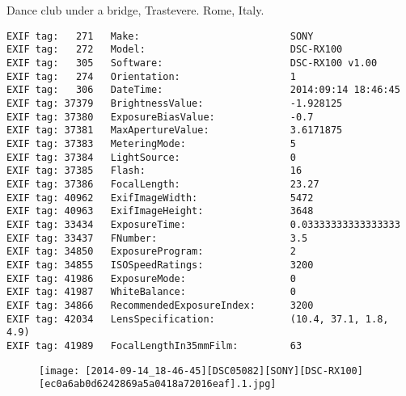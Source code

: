 \section{\protect{}}
\noindent Dance club under a bridge, Trastevere. Rome, Italy.
\noindent
\begin{lstlisting}
EXIF tag:   271   Make:                          SONY
EXIF tag:   272   Model:                         DSC-RX100
EXIF tag:   305   Software:                      DSC-RX100 v1.00
EXIF tag:   274   Orientation:                   1
EXIF tag:   306   DateTime:                      2014:09:14 18:46:45
EXIF tag: 37379   BrightnessValue:               -1.928125
EXIF tag: 37380   ExposureBiasValue:             -0.7
EXIF tag: 37381   MaxApertureValue:              3.6171875
EXIF tag: 37383   MeteringMode:                  5
EXIF tag: 37384   LightSource:                   0
EXIF tag: 37385   Flash:                         16
EXIF tag: 37386   FocalLength:                   23.27
EXIF tag: 40962   ExifImageWidth:                5472
EXIF tag: 40963   ExifImageHeight:               3648
EXIF tag: 33434   ExposureTime:                  0.03333333333333333
EXIF tag: 33437   FNumber:                       3.5
EXIF tag: 34850   ExposureProgram:               2
EXIF tag: 34855   ISOSpeedRatings:               3200
EXIF tag: 41986   ExposureMode:                  0
EXIF tag: 41987   WhiteBalance:                  0
EXIF tag: 34866   RecommendedExposureIndex:      3200
EXIF tag: 42034   LensSpecification:             (10.4, 37.1, 1.8, 4.9)
EXIF tag: 41989   FocalLengthIn35mmFilm:         63

\end{lstlisting}
\clearpage
\begin{figure}
\raggedleft
\texttt{[image: [2014-09-14\_18-46-45][DSC05082][SONY][DSC-RX100][ec0a6ab0d6242869a5a0418a72016eaf].1.jpg]}
\end{figure}


\clearpage
